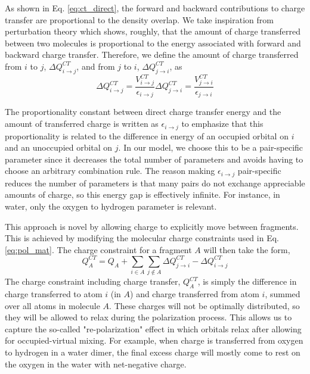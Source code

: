 \documentclass[journal=jacsat,manuscript=article]{achemso}
\begin{document}
As shown in Eq. \ref{eq:ct_direct}, the forward and backward contributions to charge transfer are proportional to the density overlap. We take inspiration from perturbation theory which shows, roughly, that the amount of charge transferred between two molecules is proportional to the energy associated with forward and backward charge transfer.\cite{khaliullin2007unravelling,khaliullin2008analysis,khaliullin2009electron} Therefore, we define the amount of charge transferred from $i$ to $j$, $\Delta Q^{CT}_{i\rightarrow j}$, and from $j$ to $i$, $\Delta Q^{CT}_{j\rightarrow i}$, as
\begin{subequations}
  \begin{equation}
  \Delta Q^{CT}_{i\rightarrow j}=\frac{V^{CT}_{i\rightarrow j}}{\epsilon_{i\rightarrow j}}
\end{equation}
\begin{equation}
  \Delta Q^{CT}_{j\rightarrow i}=\frac{V^{CT}_{j\rightarrow i}}{\epsilon_{j\rightarrow i}}
\end{equation}
\end{subequations}

The proportionality constant between direct charge transfer energy and the amount of transferred charge is written as $\epsilon_{i\rightarrow j}$ to emphasize that this proportionality is related to the difference in energy of an occupied orbital on $i$ and an unoccupied orbital on $j$.\cite{khaliullin2007unravelling} In our model, we choose this to be a pair-specific parameter since it decreases the total number of parameters and avoids having to choose an arbitrary combination rule. The reason making $\epsilon_{i\rightarrow j}$ pair-specific reduces the number of parameters is that many pairs do not exchange appreciable amounts of charge, so this energy gap is effectively infinite. For instance, in water, only the oxygen to hydrogen parameter is relevant.

This approach is novel by allowing charge to explicitly move between fragments. This is achieved by modifying the molecular charge constraints used in Eq. \ref{eq:pol_mat}. The charge constraint for a fragment $A$ will then take the form,
\begin{equation}
  Q^{CT}_A=Q_A+\sum_{i\in A}\sum_{j\notin A}\Delta Q^{CT}_{j\rightarrow i}-\Delta Q^{CT}_{i\rightarrow j}
  \label{eq:charge_constraint}
\end{equation}
The charge constraint including charge transfer, $Q^{CT}_A$, is simply the difference in charge transferred to atom $i$ (in $A$) and charge transferred from atom $i$, summed over all atoms in molecule $A$. These charges will not be optimally distributed, so they will be allowed to relax during the polarization process. This allows us to capture the so-called "re-polarization"\cite{khaliullin2007unravelling} effect in which orbitals relax after allowing for occupied-virtual mixing. For example, when charge is transferred from oxygen to hydrogen in a water dimer, the final excess charge will mostly come to rest on the oxygen in the water with net-negative charge.
\end{document}
